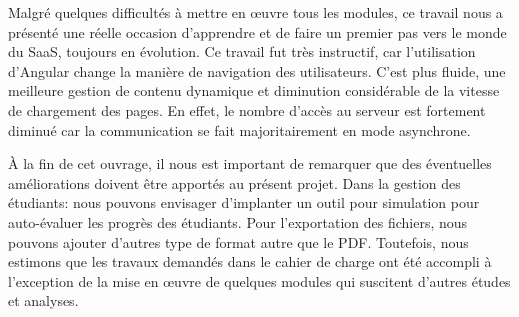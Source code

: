 Malgré quelques difficultés à mettre en œuvre tous les modules, ce travail nous a présenté une
réelle occasion d'apprendre et de faire un premier pas vers le monde du SaaS, toujours en
évolution. Ce travail fut très instructif, car l'utilisation d'Angular change la manière de navigation des utilisateurs. C'est plus fluide, une meilleure gestion de contenu dynamique et diminution considérable de la vitesse de chargement des pages. En effet, le nombre d'accès au serveur est fortement diminué car la communication se fait majoritairement en mode asynchrone.
\medskip

À la fin de cet ouvrage, il nous est important de remarquer que des éventuelles améliorations doivent être apportés au présent projet. Dans la gestion des étudiants: nous pouvons envisager d'implanter un outil pour simulation pour auto-évaluer les progrès des étudiants. Pour l'exportation des fichiers, nous pouvons ajouter d'autres type de format autre que le PDF. Toutefois, nous estimons que les travaux demandés dans le cahier de charge ont été accompli à l'exception de la mise en œuvre de quelques modules qui suscitent d'autres études et analyses.